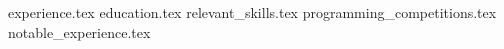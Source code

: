 \documentclass[11pt, a4papter]{awesome-cv}
\newcommand*{\sectiondir}{sections/}
\begin{document}
\makecvheader

{experience.tex}
{education.tex}
{relevant_skills.tex}
{programming_competitions.tex}
{notable_experience.tex}
\end{document}
